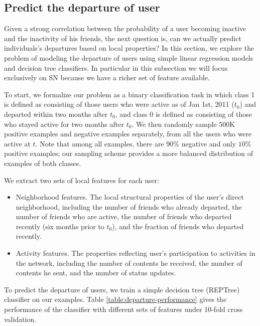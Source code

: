\documentclass[phd,tocprelim]{cornell}
\begin{document}
\subsection{Predict the departure of user}
Given a strong correlation between the probability of a user becoming inactive and the inactivity of his friends, the next question is, can we actually predict individuals's departures based on local properties? In this section, we explore the problem of modeling the departure of users using simple linear regression models and decision tree classifiers. In particular in this subsection we will focus exclusively on SN because we have a richer set of feature available.

To start, we formalize our problem as a binary classification task in which class 1 is defined as consisting of those users who were active as of Jan 1st, 2011 ($t_0$) and departed within two months after $t_0$, and class 0 is defined as consisting of those who stayed active for two months after $t_0$. We then randomly sample 500K positive examples and negative examples separately, from all the users who were active at $t$. Note that among all examples, there are $90\%$ negative and only $10\%$ positive examples; our sampling scheme provides a more balanced distribution of examples of both classes. 

We extract two sets of local features for each user:
\begin{itemize}

	\item Neighborhood features. The local structural properties of the user's direct neighborhood, including the number of friends who already departed, the number of friends who are active, the number of friends who departed recently (six months prior to $t_0$), and the fraction of friends who departed recently.
\vspace{-8pt}

	\item Activity features. The properties reflecting user's participation to activities in the network, including the number of contents he received, the number of contents he sent, and the number of status updates.
\end{itemize}

To predict the departure of users, we train a simple decision tree (REPTree) classifier on our examples. Table \ref{table:departure-performance} gives the performance of the classifier with different sets of features under 10-fold cross validation. 
\end{document}
